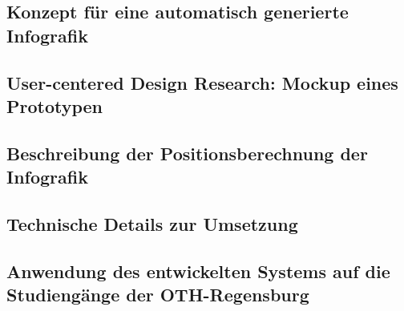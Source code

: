 \subsection{Konzept für eine automatisch generierte Infografik}

\subsection{User-centered Design Research: Mockup eines Prototypen}

\subsection{Beschreibung der Positionsberechnung der Infografik}

\subsection{Technische Details zur Umsetzung}

\subsection{Anwendung des entwickelten Systems auf die Studiengänge der OTH-Regensburg}